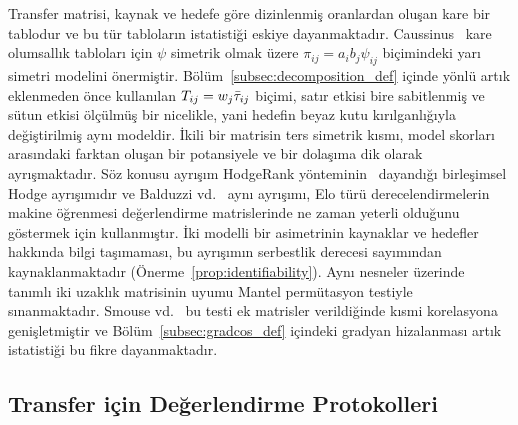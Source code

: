 Transfer matrisi, kaynak ve hedefe göre dizinlenmiş oranlardan oluşan kare bir tablodur ve bu tür tabloların istatistiği eskiye dayanmaktadır. Caussinus~\cite{caussinus1965contribution} kare olumsallık tabloları için $\psi$ simetrik olmak üzere $\pi_{ij} = a_i b_j \psi_{ij}$ biçimindeki yarı simetri modelini önermiştir. Bölüm~\ref{subsec:decomposition_def} içinde yönlü artık eklenmeden önce kullanılan $T_{ij} = w_j \bar{\tau}_{ij}$ biçimi, satır etkisi bire sabitlenmiş ve sütun etkisi ölçülmüş bir nicelikle, yani hedefin beyaz kutu kırılganlığıyla değiştirilmiş aynı modeldir. İkili bir matrisin ters simetrik kısmı, model skorları arasındaki farktan oluşan bir potansiyele ve bir dolaşıma dik olarak ayrışmaktadır. Söz konusu ayrışım HodgeRank yönteminin~\cite{jiang2011statistical} dayandığı birleşimsel Hodge ayrışımıdır ve Balduzzi vd.~\cite{balduzzi2018reevaluating} aynı ayrışımı, Elo türü derecelendirmelerin makine öğrenmesi değerlendirme matrislerinde ne zaman yeterli olduğunu göstermek için kullanmıştır. İki modelli bir asimetrinin kaynaklar ve hedefler hakkında bilgi taşımaması, bu ayrışımın serbestlik derecesi sayımından kaynaklanmaktadır (Önerme~\ref{prop:identifiability}). Aynı nesneler üzerinde tanımlı iki uzaklık matrisinin uyumu Mantel permütasyon testiyle~\cite{mantel1967detection} sınanmaktadır. Smouse vd.~\cite{smouse1986multiple} bu testi ek matrisler verildiğinde kısmi korelasyona genişletmiştir ve Bölüm~\ref{subsec:gradcos_def} içindeki gradyan hizalanması artık istatistiği bu fikre dayanmaktadır.

\subsection{Transfer için Değerlendirme Protokolleri}
\label{subsec:rw_protocols}


